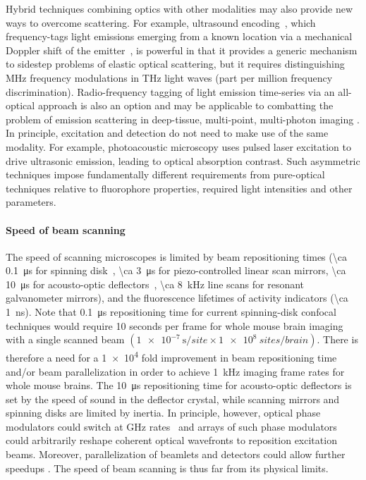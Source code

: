 Hybrid techniques combining optics with other modalities may also provide new ways to overcome scattering.
For example, ultrasound encoding~\cite{wang12}, which frequency-tags light emissions emerging from a known location via a mechanical Doppler shift of the emitter~\cite{mahan98}, is powerful in that it provides a generic mechanism to sidestep problems of elastic optical scattering, but it requires distinguishing MHz frequency modulations in THz light waves (part per million frequency discrimination). Radio-frequency tagging of light emission time-series via an all-optical approach is also an option and may be applicable to combatting the problem of emission scattering in deep-tissue, multi-point, multi-photon imaging \cite{diebold2013digitally}. In principle, excitation and detection do not need to make use of the same modality. For example, photoacoustic microscopy \cite{filonov12} uses pulsed laser excitation to drive ultrasonic emission, leading to optical absorption contrast. Such asymmetric techniques impose fundamentally different requirements from pure-optical techniques relative to fluorophore properties, required light intensities and other parameters.

\paragraph{Speed of beam scanning}
The speed of scanning microscopes is limited by beam repositioning times (\SI{\ca 0.1}{\micro\second} for spinning disk~\cite{mahalati13,kang10,flusberg05}, \SI{\ca 3}{\micro\second} for piezo-controlled linear scan mirrors, \SI{\ca 10}{\micro\second} for acousto-optic deflectors~\cite{vucinic07}, \SI{\ca 8}{\kilo\hertz} line scans for resonant galvanometer mirrors), and the fluorescence lifetimes of activity indicators (\SI{\ca 1}{\nano\second}).
Note that \SI{0.1}{\micro\second} repositioning time for current spinning-disk confocal techniques would require 10 seconds per frame for whole mouse brain imaging with a single scanned beam $\left(\SI{1e-7}{\second\per site}\times\SI{1e8}{sites\per brain}\right)$. There is therefore a need for a \num{1e4} fold improvement in beam repositioning time and/or beam parallelization in order to achieve \SI{1}{\kilo\hertz} imaging frame rates for whole mouse brains.
The \SI{10}{\micro\second} repositioning time for acousto-optic deflectors is set by the speed of sound in the deflector crystal, while scanning mirrors and spinning disks are limited by inertia.
In principle, however, optical phase modulators could switch at GHz rates~\cite{alivisatos13} and arrays of such phase modulators could arbitrarily reshape coherent optical wavefronts to reposition excitation beams.
Moreover, parallelization of beamlets and detectors could allow further speedups \cite{alivisatos13}.
The speed of beam scanning is thus far from its physical limits.

